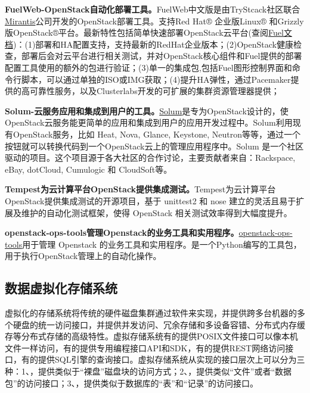 \documentclass[letterpaper,10pt,english]{sphinxmanual}
\begin{document}
\textbf{FuelWeb-OpenStack自动化部署工具。}FuelWeb中文版是由TryStcack社区联合\href{https://www.mirantis.com/products/mirantis-openstack-software/}{Mirantis}公司开发的OpenStack部署工具。支持Red
Hat® 企业版Linux®
和Grizzly版OpenStack®平台。最新特性包括简单快速部署OpenStack云平台(查阅\href{https://www.mirantis.com/products/mirantis-openstack-software/openstack-deployment-fuel/}{Fuel文档})：(1)部署和HA配置支持，支持最新的RedHat企业版本；(2)OpenStack健康检查，部署后会对云平台进行相关测试，并对OpenStack核心组件和Fuel提供的部署配置工具使用的额外的包进行验证；(3)单一的集成包,包括Fuel图形控制界面和命令行脚本，可以通过单独的ISO或IMG获取；(4)提升HA弹性，通过Pacemaker提供的高可靠性服务，以及Clusterlabs开发的可扩展的集群资源管理器提供；

\textbf{Solum-云服务应用和集成到用户的工具。}\href{https://wiki.openstack.org/wiki/Solum}{Solum}是专为OpenStack设计的，使OpenStack云服务能更简单的应用和集成到用户的应用开发过程中。Solum利用现有OpenStack服务，比如
Heat, Nova, Glance, Keystone,
Neutron等等，通过一个按钮就可以转换代码到一个OpenStack云上的管理应用程序中。Solum
是一个社区驱动的项目。这个项目源于各大社区的合作讨论，主要贡献者来自：Rackspace,
eBay, dotCloud, Cumulogic 和 CloudSoft等。

\textbf{Tempest为云计算平台OpenStack提供集成测试。}Tempest为云计算平台OpenStack提供集成测试的开源项目，基于
unittest2 和 nose 建立的灵活且易于扩展及维护的自动化测试框架，使得
OpenStack 相关测试效率得到大幅度提升。

\textbf{openstack-ops-tools管理Openstack的业务工具和实用程序。}\href{https://github.com/yahoo/openstack-ops-tools}{openstack-ops-tools}用于管理
Openstack
的业务工具和实用程序。是一个Python编写的工具包，用于执行OpenStack管理上的自动化操作。


\subsection{数据虚拟化存储系统}
\label{gispark_cloud:_u6570_u636e_u865a_u62df_u5316_u5b58_u50a8_u7cfb_u7edf}
虚拟化的存储系统将传统的硬件磁盘集群通过软件来实现，并提供跨多台机器的多个硬盘的统一访问接口，并提供并发访问、冗余存储和多设备容错、分布式内存缓存等分布式存储的高级特性。虚拟存储系统有的提供POSIX文件接口可以像本机文件一样访问，有的提供专用编程接口API和SDK，有的提供REST网络访问接口，有的提供SQL引擎的查询接口。虚拟存储系统从实现的接口层次上可以分为三种：1、，提供类似于“裸盘”磁盘块的访问方式；2、，提供类似“文件”或者“数据包”的访问接口；3、，提供类似于数据库的“表”和“记录”的访问接口。
\end{document}
